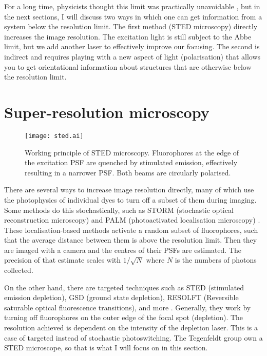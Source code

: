 For a long time, physicists thought this limit was practically unavoidable \cite{McCutchen1967}, but in the next sections, I will discuss two ways in which one can get information from a system below the resolution limit. The first method (STED microscopy) directly increases the image resolution. The excitation light is still subject to the Abbe limit, but we add another laser to effectively improve our focusing. The second is indirect and requires playing with a new aspect of light (polarisation) that allows you to get orientational information about structures that are otherwise below the resolution limit.

\section{Super-resolution microscopy}

\begin{figure}
	\centering
	\texttt{[image: sted.ai]}
	\caption{
		Working principle of STED microscopy. Fluorophores at the edge of the excitation PSF are quenched by stimulated emission, effectively resulting in a narrower PSF. Both beams are circularly polarised. 
	}
	\label{fig:sted principle}
\end{figure}

There are several ways to increase image resolution directly, many of which use the photophysics of individual dyes to turn off a subset of them during imaging. Some methods do this stochastically, such as STORM (stochastic optical reconstruction microscopy) and PALM (photoactivated localisation microscopy) \cite{Mock2009, Betzig2006}. These localisation-based methods activate a random subset of fluorophores, such that the average distance between them is above the resolution limit. Then they are imaged with a camera and the centres of their PSFs are estimated. The precision of that estimate scales with $ 1/\sqrt{N} $ where $ N $ is the numbers of photons collected.

On the other hand, there are targeted techniques such as STED (stimulated emission depletion), GSD (ground state depletion), RESOLFT (Reversible saturable optical fluorescence transitions), and more \cite{Klar2000, Folling2008, Hofmann2005}. Generally, they work by turning off fluorophores on the outer edge of the focal spot (depletion). The resolution achieved is dependent on the intensity of the depletion laser. This is a case of targeted instead of stochastic photoswitching. The Tegenfeldt group own a STED microscope, so that is what I will focus on in this section. 


